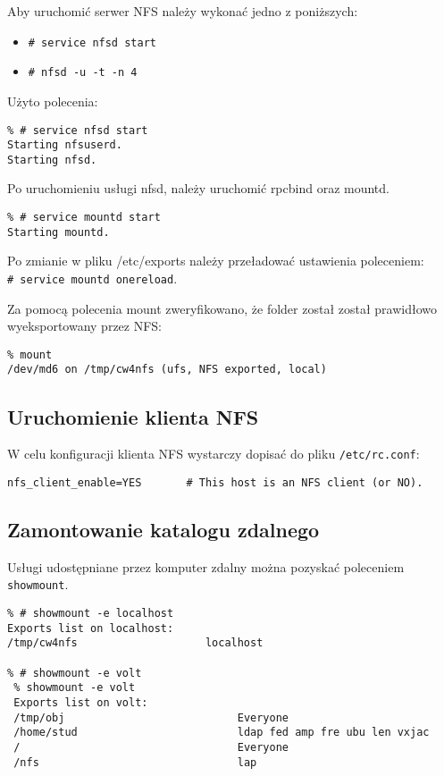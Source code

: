 \documentclass[a4paper,11pt]{article}
\begin{document}
Aby uruchomić serwer NFS należy wykonać jedno z poniższych:
\begin{itemize}
	\item \texttt{\# service nfsd start}
	\item \texttt{\# nfsd -u -t -n 4}
\end{itemize}


Użyto polecenia:
\footnotesize\begin{verbatim}
% # service nfsd start
Starting nfsuserd.
Starting nfsd.
\end{verbatim}\normalsize

Po uruchomieniu usługi nfsd, należy uruchomić rpcbind oraz mountd.
\footnotesize\begin{verbatim}
% # service mountd start
Starting mountd.
\end{verbatim}\normalsize



Po zmianie w pliku /etc/exports należy przeładować ustawienia poleceniem:\\ \texttt{\# service mountd onereload}.

Za pomocą polecenia mount zweryfikowano, że folder został został prawidłowo wyeksportowany przez NFS:

\footnotesize\begin{verbatim}
% mount
/dev/md6 on /tmp/cw4nfs (ufs, NFS exported, local)
\end{verbatim}\normalsize


\subsection{Uruchomienie klienta NFS}
W celu konfiguracji klienta NFS wystarczy dopisać do pliku \texttt{/etc/rc.conf}:
\footnotesize\begin{verbatim}
nfs_client_enable=YES		# This host is an NFS client (or NO).
\end{verbatim}\normalsize

\subsection{Zamontowanie katalogu zdalnego}

Usługi udostępniane przez komputer zdalny można pozyskać poleceniem \texttt{showmount}.
\footnotesize\begin{verbatim}
% # showmount -e localhost
Exports list on localhost:
/tmp/cw4nfs                    localhost 

% # showmount -e volt
 % showmount -e volt
 Exports list on volt:
 /tmp/obj                           Everyone
 /home/stud                         ldap fed amp fre ubu len vxjac 
 /                                  Everyone
 /nfs                               lap 
\end{verbatim}\normalsize
\end{document}
